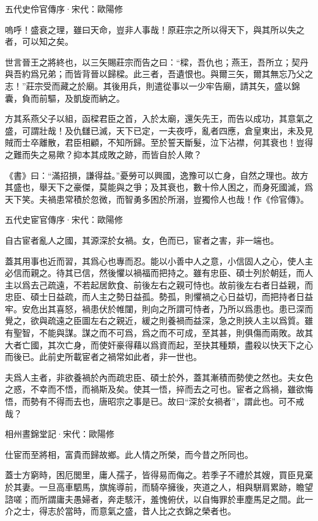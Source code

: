 \documentclass[12pt,a4paper]{ctexbook}
\begin{document}
五代史伶官傳序·宋代：歐陽修 \par
嗚呼！盛衰之理，雖曰天命，豈非人事哉！原莊宗之所以得天下，與其所以失之者，可以知之矣。\par
世言晉王之將終也，以三矢賜莊宗而告之曰：“樑，吾仇也；燕王，吾所立；契丹與吾約爲兄弟；而皆背晉以歸樑。此三者，吾遺恨也。與爾三矢，爾其無忘乃父之志！”莊宗受而藏之於廟。其後用兵，則遣從事以一少牢告廟，請其矢，盛以錦囊，負而前驅，及凱旋而納之。\par
方其系燕父子以組，函樑君臣之首，入於太廟，還矢先王，而告以成功，其意氣之盛，可謂壯哉！及仇讎已滅，天下已定，一夫夜呼，亂者四應，倉皇東出，未及見賊而士卒離散，君臣相顧，不知所歸。至於誓天斷髮，泣下沾襟，何其衰也！豈得之難而失之易歟？抑本其成敗之跡，而皆自於人歟？\par
《書》曰：“滿招損，謙得益。”憂勞可以興國，逸豫可以亡身，自然之理也。故方其盛也，舉天下之豪傑，莫能與之爭；及其衰也，數十伶人困之，而身死國滅，爲天下笑。夫禍患常積於忽微，而智勇多困於所溺，豈獨伶人也哉！作《伶官傳》。\par
五代史宦官傳序·宋代：歐陽修 \par
自古宦者亂人之國，其源深於女禍。女，色而已，宦者之害，非一端也。\par
蓋其用事也近而習，其爲心也專而忍。能以小善中人之意，小信固人之心，使人主必信而親之。待其已信，然後懼以禍福而把持之。雖有忠臣、碩士列於朝廷，而人主以爲去己疏遠，不若起居飲食、前後左右之親可恃也。故前後左右者日益親，而忠臣、碩士日益疏，而人主之勢日益孤。勢孤，則懼禍之心日益切，而把持者日益牢。安危出其喜怒，禍患伏於帷闥，則向之所謂可恃者，乃所以爲患也。患已深而覺之，欲與疏遠之臣圖左右之親近，緩之則養禍而益深，急之則挾人主以爲質。雖有聖智，不能與謀。謀之而不可爲，爲之而不可成，至其甚，則俱傷而兩敗。故其大者亡國，其次亡身，而使奸豪得藉以爲資而起，至抉其種類，盡殺以快天下之心而後已。此前史所載宦者之禍常如此者，非一世也。\par
夫爲人主者，非欲養禍於內而疏忠臣、碩士於外，蓋其漸積而勢使之然也。夫女色之惑，不幸而不悟，而禍斯及矣。使其一悟，捽而去之可也。宦者之爲禍，雖欲悔悟，而勢有不得而去也，唐昭宗之事是已。故曰“深於女禍者”，謂此也。可不戒哉？\par
相州晝錦堂記·宋代：歐陽修 \par
仕宦而至將相，富貴而歸故鄉。此人情之所榮，而今昔之所同也。\par
蓋士方窮時，困厄閭里，庸人孺子，皆得易而侮之。若季子不禮於其嫂，買臣見棄於其妻。一旦高車駟馬，旗旄導前，而騎卒擁後，夾道之人，相與駢肩累跡，瞻望諮嗟；而所謂庸夫愚婦者，奔走駭汗，羞愧俯伏，以自悔罪於車塵馬足之間。此一介之士，得志於當時，而意氣之盛，昔人比之衣錦之榮者也。\par
\end{document}
